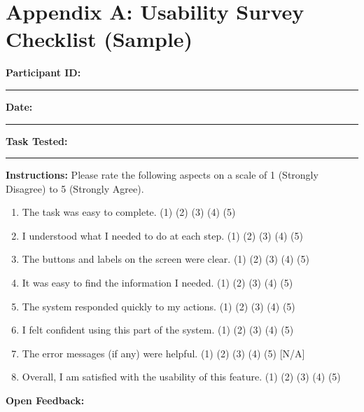 \documentclass[12pt, titlepage]{article}
\begin{document}
\clearpage
\appendix
\section{Appendix A: Usability Survey Checklist (Sample)} \label{appendix:usability}

\textbf{Participant ID:} \rule{1cm}{0.4pt} \quad \textbf{Date:} \rule{1.5cm}{0.4pt} \quad \textbf{Task Tested:} \rule{4cm}{0.4pt} %

\bigskip

\textbf{Instructions:} Please rate the following aspects on a scale of 1 (Strongly Disagree) to 5 (Strongly Agree).

\begin{enumerate}
    \item The task was easy to complete. \quad (1) (2) (3) (4) (5)
    \item I understood what I needed to do at each step. \quad (1) (2) (3) (4) (5)
    \item The buttons and labels on the screen were clear. \quad (1) (2) (3) (4) (5)
    \item It was easy to find the information I needed. \quad (1) (2) (3) (4) (5)
    \item The system responded quickly to my actions. \quad (1) (2) (3) (4) (5)
    \item I felt confident using this part of the system. \quad (1) (2) (3) (4) (5)
    \item The error messages (if any) were helpful. \quad (1) (2) (3) (4) (5) [N/A]
    \item Overall, I am satisfied with the usability of this feature. \quad (1) (2) (3) (4) (5)
\end{enumerate}

\bigskip

\textbf{Open Feedback:}

\end{document}
